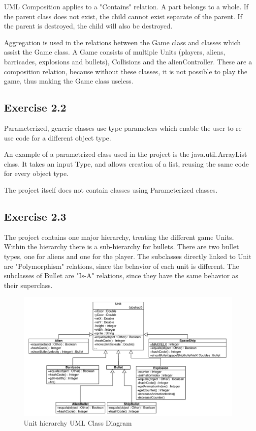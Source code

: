 \documentclass[10pt]{article}
\begin{document}
UML Composition applies to a "Contains" relation.
A part belongs to a whole. If the parent class does not exist, the child cannot exist separate of the parent. 
If the parent is destroyed, the child will also be destroyed.

Aggregation is used in the relations between the Game class and classes which assist the Game class.
A Game consists of multiple Units (players, aliens, barricades, explosions and bullets), Collisions and the alienController. These are a composition relation, because without these classes, it is not possible to play the game, thus making the Game class useless.

\subsection*{Exercise  2.2}
Parameterized, generic classes use type parameters which enable the user to re-use code for a different object type. 

An example of a parametrized class used in the project is the java.util.ArrayList class.
It takes an input Type, and allows creation of a list, reusing the same code for every object type.

The project itself does not contain classes using Parameterized classes.
\pagebreak
\subsection*{Exercise  2.3}
The project contains one major hierarchy, treating the different game Units. 
Within the hierarchy there is a sub-hierarchy for bullets. There are two bullet types, one for aliens and one for the player.
The subclasses directly linked to Unit are "Polymorphism" relations, since the behavior of each unit is different.
The subclasses of Bullet are "Is-A" relations, since they have the same behavior as their superclass.

\begin{figure}[ht!]
\includegraphics[width=1.1\textwidth]{SI-UMLhierarchies.pdf}
\caption{Unit hierarchy UML Class Diagram}
\end{figure}
\end{document}
